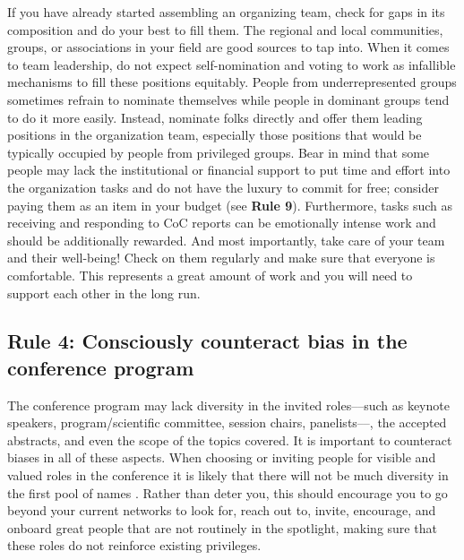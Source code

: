 \documentclass[10pt,letterpaper]{article}
\begin{document}
If you have already started assembling an organizing team, check for gaps in its composition and do your best to fill them. 
The regional and local communities, groups, or associations in your field are good sources to tap into. 
When it comes to team leadership, do not expect self-nomination and voting to work as infallible mechanisms to fill these positions equitably. 
People from underrepresented groups sometimes refrain to nominate themselves while people in dominant groups tend to do it more easily. 
Instead, nominate folks directly and offer them leading positions in the organization team, especially those positions that would be typically occupied by people from privileged groups.
Bear in mind that some people may lack the institutional or financial support to put time and effort into the organization tasks and do not have the luxury to commit for free; consider paying them as an item in your budget (see \textbf{Rule 9}).
Furthermore, tasks such as receiving and responding to CoC reports can be emotionally intense work and should be additionally rewarded.
And most importantly, take care of your team and their well-being! Check on them regularly and make sure that everyone is comfortable. This represents a great amount of work and you will need to support each other in the long run.


\subsection*{Rule 4: Consciously counteract bias in the conference program}
\label{rule_unbias}

The conference program may lack diversity in the invited roles––such as keynote speakers, program/scientific committee, session chairs, panelists––, the accepted abstracts, and even the scope of the topics covered. 
It is important to counteract biases in all of these aspects.
When choosing or inviting people for visible and valued roles in the conference it is likely that there will not be much diversity in the first pool of names \cite{dwyerNoticeWhoScience2021,swartzScienceValueDiversity2019,wongBuildDiversityScience2020,dignazioUnicornsJanitorsNinjas2020}. 
Rather than deter you, this should encourage you to go beyond your current networks to look for, reach out to, invite, encourage, and onboard great people that are not routinely in the spotlight, making sure that these roles do not reinforce existing privileges.
\end{document}

